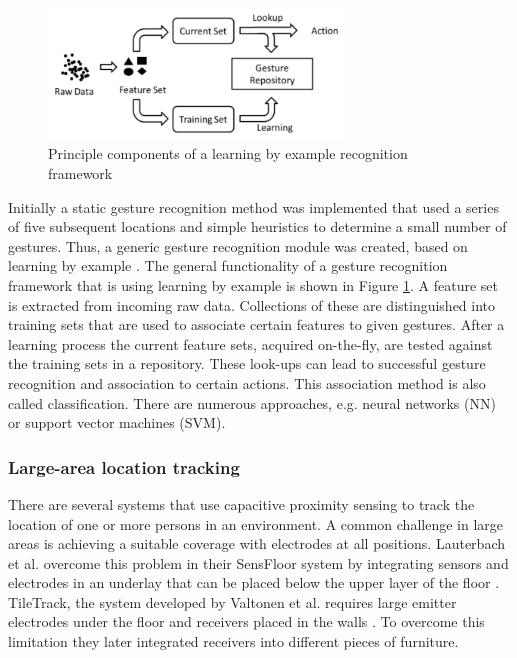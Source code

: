 \begin{figure}[h]
\centering
\includegraphics[width=0.7\textwidth]{images/gesture_by_example}
\caption{Principle components of a learning by example recognition framework \cite{braun2013capacitive}}
\label{fig:gesture_by_example}
\end{figure}
Initially a static gesture recognition method was implemented that used a series of five subsequent locations and simple heuristics to determine a small number of gestures. Thus, a generic gesture recognition module was created, based on learning by example \cite{braun2013capacitive}. The general functionality of a gesture recognition framework that is using learning by example is shown in Figure \ref{fig:gesture_by_example}. A feature set is extracted from incoming raw data. Collections of these are distinguished into training sets that are used to associate certain features to given gestures. After a learning process the current feature sets, acquired on-the-fly, are tested against the training sets in a repository. These look-ups can lead to successful gesture recognition and association to certain actions. This association method is also called classification. There are numerous approaches, e.g. neural networks (NN) or support vector machines (SVM).

\subsubsection{Large-area location tracking}
There are several systems that use capacitive proximity sensing to track the location of one or more persons in an environment. A common challenge in large areas is achieving a suitable coverage with electrodes at all positions. Lauterbach et al. overcome this problem in their SensFloor system by integrating sensors and electrodes in an underlay that can be placed below the upper layer of the floor \cite{lauterbach2009}. TileTrack, the system developed by Valtonen et al. requires large emitter electrodes under the floor and receivers placed in the walls \cite{Valtonen2009a}. To overcome this limitation they later integrated receivers into different pieces of furniture.

